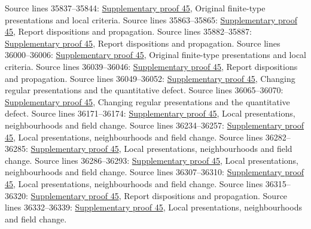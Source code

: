 \begin{AlgebraSourceRoutes}
 Source lines 35837--35844: \hyperlink{algebra_lci_notes_20260928}{Supplementary proof 45}, Original finite-type presentations and local criteria.
 Source lines 35863--35865: \hyperlink{algebra_lci_notes_20260928}{Supplementary proof 45}, Report dispositions and propagation.
 Source lines 35882--35887: \hyperlink{algebra_lci_notes_20260928}{Supplementary proof 45}, Report dispositions and propagation.
 Source lines 36000--36006: \hyperlink{algebra_lci_notes_20260928}{Supplementary proof 45}, Original finite-type presentations and local criteria.
 Source lines 36039--36046: \hyperlink{algebra_lci_notes_20260928}{Supplementary proof 45}, Report dispositions and propagation.
 Source lines 36049--36052: \hyperlink{algebra_lci_notes_20260928}{Supplementary proof 45}, Changing regular presentations and the quantitative defect.
 Source lines 36065--36070: \hyperlink{algebra_lci_notes_20260928}{Supplementary proof 45}, Changing regular presentations and the quantitative defect.
 Source lines 36171--36174: \hyperlink{algebra_lci_notes_20260928}{Supplementary proof 45}, Local presentations, neighbourhoods and field change.
 Source lines 36234--36257: \hyperlink{algebra_lci_notes_20260928}{Supplementary proof 45}, Local presentations, neighbourhoods and field change.
 Source lines 36282--36285: \hyperlink{algebra_lci_notes_20260928}{Supplementary proof 45}, Local presentations, neighbourhoods and field change.
 Source lines 36286--36293: \hyperlink{algebra_lci_notes_20260928}{Supplementary proof 45}, Local presentations, neighbourhoods and field change.
 Source lines 36307--36310: \hyperlink{algebra_lci_notes_20260928}{Supplementary proof 45}, Local presentations, neighbourhoods and field change.
 Source lines 36315--36320: \hyperlink{algebra_lci_notes_20260928}{Supplementary proof 45}, Report dispositions and propagation.
 Source lines 36332--36339: \hyperlink{algebra_lci_notes_20260928}{Supplementary proof 45}, Local presentations, neighbourhoods and field change.

\end{AlgebraSourceRoutes}
